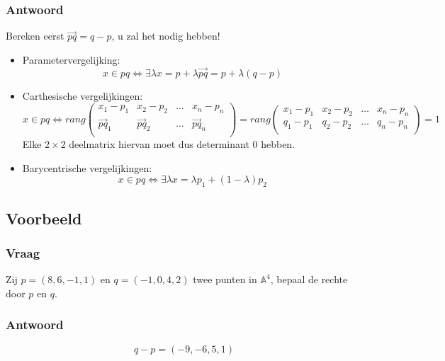 \documentclass[main.tex]{subfiles}
\begin{document}
\subsubsection*{Antwoord}
Bereken eerst $\overrightarrow{pq}= q-p$, u zal het nodig hebben!
\begin{itemize}
\item Parametervergelijking:
  \[
  x\in pq \Leftrightarrow \exists \lambda
  x = p + \lambda \overrightarrow{pq} = p + \lambda (q-p)
  \]
\item Carthesische vergelijkingen:
  \[
  x\in pq \Leftrightarrow
  rang
  \begin{pmatrix}
    x_{1}-p_{1} & x_{2}-p_{2} & \hdots & x_{n}-p_{n}\\
    \overrightarrow{pq}_{1} & \overrightarrow{pq}_{2} & \hdots & \overrightarrow{pq}_{n}\\
  \end{pmatrix}
  =
  rang
  \begin{pmatrix}
    x_{1}-p_{1} & x_{2}-p_{2} & \hdots & x_{n}-p_{n}\\
    q_{1}-p_{1} & q_{2}-p_{2} & \hdots & q_{n}-p_{n}\\
  \end{pmatrix}
  = 1
  \]
  Elke $2\times 2$ deelmatrix hiervan moet dus determinant $0$ hebben.
\item Barycentrische vergelijkingen:
  \[
  x\in pq \Leftrightarrow \exists \lambda
  x = \lambda p_{1} + (1-\lambda)p_{2}
  \]
\end{itemize}

\subsection*{Voorbeeld}
\subsubsection*{Vraag}
\begin{center}
  Zij $p=(8,6,-1,1)$ en $q=(-1,0,4,2)$ twee punten in $\mathbb{A}^{4}$, bepaal de rechte door $p$ en $q$.
\end{center}

\subsubsection*{Antwoord}
\[ q-p= (-9,-6,5,1) \]
\end{document}

